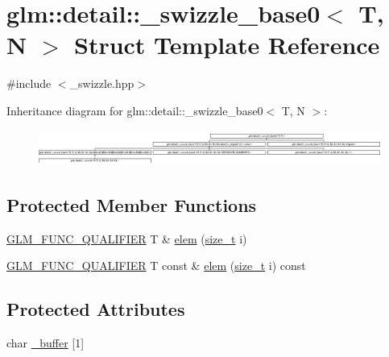 \hypertarget{structglm_1_1detail_1_1__swizzle__base0}{}\section{glm\+:\+:detail\+:\+:\+\_\+swizzle\+\_\+base0$<$ T, N $>$ Struct Template Reference}
\label{structglm_1_1detail_1_1__swizzle__base0}


{\ttfamily \#include $<$\+\_\+swizzle.\+hpp$>$}

Inheritance diagram for glm\+:\+:detail\+:\+:\+\_\+swizzle\+\_\+base0$<$ T, N $>$\+:\begin{figure}[H]
\begin{center}
\leavevmode
\includegraphics[height=1.177708cm]{structglm_1_1detail_1_1__swizzle__base0}
\end{center}
\end{figure}
\subsection*{Protected Member Functions}
\begin{DoxyCompactItemize}
\item 
\hyperlink{setup_8hpp_a33fdea6f91c5f834105f7415e2a64407}{G\+L\+M\+\_\+\+F\+U\+N\+C\+\_\+\+Q\+U\+A\+L\+I\+F\+I\+ER} T \& \hyperlink{structglm_1_1detail_1_1__swizzle__base0_a4011ff1a445ccda72c385462106eb3ff}{elem} (\hyperlink{_s_d_l__config__winrt_8h_a7c94ea6f8948649f8d181ae55911eeaf}{size\+\_\+t} i)
\item 
\hyperlink{setup_8hpp_a33fdea6f91c5f834105f7415e2a64407}{G\+L\+M\+\_\+\+F\+U\+N\+C\+\_\+\+Q\+U\+A\+L\+I\+F\+I\+ER} T const  \& \hyperlink{structglm_1_1detail_1_1__swizzle__base0_a495081f60b8fc565a5a35bfdd8b13c84}{elem} (\hyperlink{_s_d_l__config__winrt_8h_a7c94ea6f8948649f8d181ae55911eeaf}{size\+\_\+t} i) const
\end{DoxyCompactItemize}
\subsection*{Protected Attributes}
\begin{DoxyCompactItemize}
\item 
char \hyperlink{structglm_1_1detail_1_1__swizzle__base0_afd4b7f15c9acff4cdef808f559ffec2d}{\+\_\+buffer} \mbox{[}1\mbox{]}
\end{DoxyCompactItemize}


